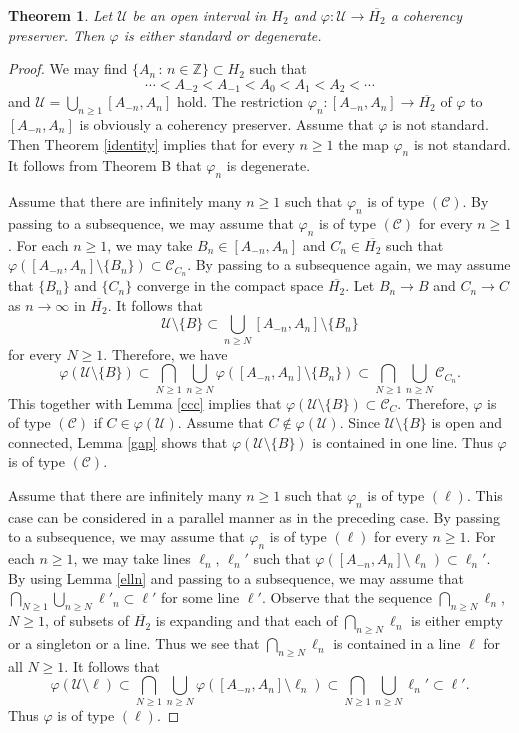 \documentclass[10pt]{amsart}
\newtheorem{theorem}{Theorem}[section]
\theoremstyle{definition}
\theoremstyle{remark}
\numberwithin{subsection}{section}
\numberwithin{equation}{section}
\newcommand\oH{{\overline{H_2}}}
\begin{document}
\begin{theorem}\label{degenerate}
Let $\mathcal{U}$ be an open interval in $H_2$ and $\varphi\colon \mathcal{U}\to \oH$ a coherency preserver.  Then $\varphi$ is either standard or degenerate. 
\end{theorem}
\begin{proof}
We may find $\{A_n\,:\, n\in \mathbb{Z}\}\subset H_2$ such that 
\[
\cdots<A_{-2}<A_{-1}<A_0<A_1<A_2<\cdots
\]
and $\mathcal{U}=\bigcup_{n\geq 1} [A_{-n}, A_n]$ hold. 
The restriction $\varphi_n\colon [A_{-n}, A_n]\to \oH$ of $\varphi$ to $[A_{-n}, A_n]$ is obviously a coherency preserver. 
Assume that $\varphi$ is not standard. 
Then Theorem \ref{identity} implies that for every $n\geq 1$ the map $\varphi_n$ is not standard.
It follows from Theorem B that $\varphi_n$ is degenerate. 

Assume that there are infinitely many $n\geq 1$ such that $\varphi_n$ is of type $(\mathcal{C})$. 
By passing to a subsequence, we may assume that $\varphi_n$ is of type $(\mathcal{C})$ for every $n\geq 1$. 
For each $n\geq 1$, we may take $B_n\in [A_{-n}, A_n]$ and $C_n\in \oH$ such that $\varphi([A_{-n}, A_n]\setminus \{B_n\})\subset \mathcal{C}_{C_n}$. 
By passing to a subsequence again, we may assume that $\{B_n\}$ and $\{C_n\}$ converge in the compact space $\oH$. 
Let $B_n\to B$ and $C_n \to C$ as $n\to \infty$ in $\oH$. 
It follows that 
\[
\mathcal{U}\setminus\{B\} \subset \bigcup_{n\geq N}[A_{-n}, A_n]\setminus \{B_n\}
\]
for every $N\geq 1$. Therefore, we have
\[
\varphi(\mathcal{U}\setminus \{B\}) \subset \bigcap_{N\geq 1}\bigcup_{n\geq N}\varphi([A_{-n}, A_n]\setminus \{B_n\}) \subset \bigcap_{N\geq 1}\bigcup_{n\geq N} \mathcal{C}_{C_n}.
\]
This together with Lemma \ref{ccc} implies that $\varphi(\mathcal{U}\setminus \{B\})\subset \mathcal{C}_C$. Therefore, $\varphi$ is of type $(\mathcal{C})$ if $C\in \varphi(\mathcal{U})$. 
Assume that $C\notin \varphi(\mathcal{U})$. Since $\mathcal{U}\setminus\{B\}$ is open and connected, Lemma \ref{gap} shows that $\varphi(\mathcal{U}\setminus \{B\})$ is contained in one line. Thus $\varphi$ is of type $(\mathcal{C})$.

Assume that there are infinitely many $n\geq 1$ such that $\varphi_n$ is of type $(\ell)$. 
This case can be considered in a parallel manner as in the preceding case.
By passing to a subsequence, we may assume that $\varphi_n$ is of type $(\ell)$ for every $n\geq 1$. 
For each $n\geq 1$, we may take lines $\ell_n$, $\ell_n'$ such that $\varphi([A_{-n}, A_n]\setminus \ell_n)\subset \ell_n'$. 
By using Lemma \ref{elln} and passing to a subsequence, we may assume that $\bigcap_{N\geq 1}\bigcup_{n\geq N} \ell'_{n}\subset \ell'$ for some line $\ell'$. 
Observe that the sequence $\bigcap_{n\geq N} \ell_n$,  $N\geq 1$, of subsets of $\oH$ is expanding and that each of $\bigcap_{n\geq N} \ell_n$ is either empty or a singleton or a line. Thus we see that $\bigcap_{n\geq N} \ell_n$ is contained in a line $\ell$ for all $N\geq 1$.
It follows that 
\[
\varphi(\mathcal{U}\setminus \ell)\subset \bigcap_{N\geq 1}\bigcup_{n\geq N}\varphi([A_{-n}, A_n]\setminus \ell_n) \subset \bigcap_{N\geq 1}\bigcup_{n\geq N} \ell_n'\subset \ell'.
\]
Thus $\varphi$ is of type $(\ell)$.
\end{proof}
\end{document}
